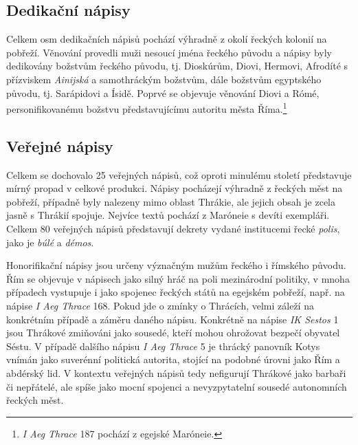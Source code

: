 \subsection[dedikační-nápisy-7]{Dedikační nápisy}

Celkem osm dedikačních nápisů pochází výhradně z okolí řeckých kolonií na pobřeží. Věnování provedli muži nesoucí jména řeckého původu a nápisy byly dedikovány božstvům řeckého původu, tj. Dioskúrům, Diovi, Hermovi, Afrodíté s přízviskem {\em Ainijská} a samothráckým božstvům, dále božstvům egyptského původu, tj. Sarápidovi a Ísidě. Poprvé se objevuje věnování Diovi a Rómé, personifikovanému božstvu představujícímu autoritu města Říma.\footnote{{\em I Aeg Thrace} 187 pochází z egejské Maróneie.}

\subsection[veřejné-nápisy-7]{Veřejné nápisy}

Celkem se dochovalo 25 veřejných nápisů, což oproti minulému století představuje mírný propad v celkové produkci. Nápisy pocházejí výhradně z řeckých měst na pobřeží, případně byly nalezeny mimo oblast Thrákie, ale jejich obsah je zcela jasně s Thrákií spojuje. Nejvíce textů pochází z Maróneie s devíti exempláři. Celkem 80  veřejných nápisů představují dekrety vydané institucemi řecké {\em polis}, jako je {\em búlé} a {\em démos}.

Honorifikační nápisy jsou určeny význačným mužům řeckého i římského původu. Řím se objevuje v nápisech jako silný hráč na poli mezinárodní politiky, v mnoha případech vystupuje i jako spojenec řeckých států na egejském pobřeží, např. na nápise {\em I Aeg Thrace} 168. Pokud jde o zmínky o Thrácích, velmi záleží na konkrétním případě a záměru daného nápisu. Konkrétně na nápise {\em IK Sestos} 1 jsou Thrákové zmiňováni jako sousedé, kteří mohou ohrožovat bezpečí obyvatel Séstu. V případě dalšího nápisu {\em I Aeg Thrace} 5 je thrácký panovník Kotys vnímán jako suverénní politická autorita, stojící na podobné úrovni jako Řím a abdérský lid. V kontextu veřejných nápisů tedy nefigurují Thrákové jako barbaři či nepřátelé, ale spíše jako mocní spojenci a nevyzpytatelní sousedé autonomních řeckých měst.

